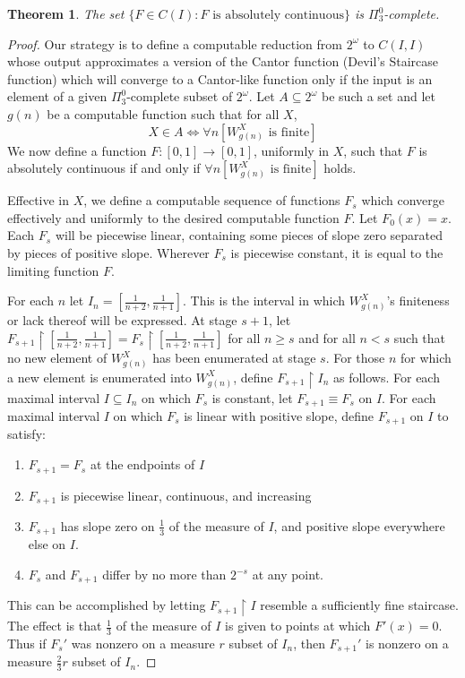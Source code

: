 \documentclass[12pt]{amsart}
\newtheorem{theorem}{Theorem}
\newcommand{\uhr}{\upharpoonright}
\begin{document}
\begin{theorem}
The set $\{F\in C(I) : F \text{ is absolutely continuous}\}$ is $\Pi^0_3$-complete.
\end{theorem}
\begin{proof}
Our strategy is to define a computable reduction from $2^\omega$ 
to $C(I,I)$ whose output
approximates a version of the Cantor function (Devil's Staircase function) 
which 
will converge to a Cantor-like function only if the input is an element 
of a given $\Pi^0_3$-complete subset of $2^\omega$.  Let $A\subseteq 2^\omega$ 
be such a set and let $g(n)$ be a computable function such that 
for all $X$, $$X \in A \iff \forall n [W_{g(n)}^X \text{ is finite} ]$$
We now define a function $F:[0,1]\rightarrow [0,1]$, uniformly in $X$, 
such that $F$ is absolutely continuous if and only if 
$\forall n [W_{g(n)}^X \text{ is finite}]$ holds.

Effective in $X$, we define a computable sequence of functions $F_s$ which converge effectively and uniformly to the desired computable function $F$.  Let $F_0(x) = x$.  Each $F_s$ will be piecewise linear, containing some pieces of slope zero separated by pieces of positive slope.    Wherever $F_s$ is piecewise constant, it is equal to the limiting function $F$.

For each $n$ let $I_n=[\frac{1}{n+2},\frac{1}{n+1}]$.  This is the interval in which $W_{g(n)}^X$'s finiteness or lack thereof will be expressed.  
At stage $s+1$, let $F_{s+1}\uhr[\frac{1}{n+2},\frac{1}{n+1}] = 
F_s \uhr[\frac{1}{n+2},\frac{1}{n+1}] $ for all $n\geq s$ and for all 
$n<s$ such that no new element of $W_{g(n)}^X$ has been enumerated at 
stage $s$.  For those $n$ for which a new element is enumerated into 
$W_{g(n)}^X$, define $F_{s+1}\uhr I_n$ as follows.  For each maximal interval $I\subseteq I_n$ on which $F_s$ is constant, let $F_{s+1} \equiv F_s$ on $I$.  For each maximal interval $I$ on which $F_s$ is linear with positive slope, define $F_{s+1}$ on $I$ to satisfy:
\begin{enumerate}
\item $F_{s+1} = F_{s}$ at the endpoints of $I$
\item $F_{s+1}$ is piecewise linear, continuous, and increasing
\item $F_{s+1}$ has slope zero on $\frac{1}{3}$ of the measure of $I$, 
and positive slope everywhere else on $I$.
\item $F_s$ and $F_{s+1}$ differ by no more than $2^{-s}$ at any point.
\end{enumerate}
This can be accomplished by letting $F_{s+1}\uhr I$ resemble a sufficiently fine staircase.  The effect is that $\frac{1}{3}$ of the  measure of $I$ is given to points at which $F'(x) = 0$.  Thus if $F_s'$ was nonzero on a measure $r$ subset of $I_n$, then $F_{s+1}'$ is nonzero on a measure $\frac{2}{3}r$ subset of $I_n$.


\end{proof}
\end{document}

